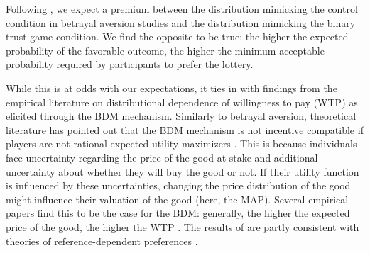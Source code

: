 Following \cite{Li2020a}, we expect a premium between the distribution mimicking the control condition in betrayal aversion studies and the distribution mimicking the binary trust game condition.
We find the opposite to be true: the higher the expected probability of the favorable outcome, the higher the minimum acceptable probability required by participants to prefer the lottery.

While this is at odds with our expectations, it ties in with findings from the empirical literature on distributional dependence of willingness to pay (WTP) as elicited through the BDM mechanism.
Similarly to betrayal aversion, theoretical literature has pointed out that the BDM mechanism is not incentive compatible if players are not rational expected utility maximizers \citep{Karni1987,Horowitz2006}.
This is because individuals face uncertainty regarding the price of the good at stake and additional uncertainty about whether they will buy the good or not.
If their utility function is influenced by these uncertainties, changing the price distribution of the good might influence their valuation of the good (here, the MAP).
Several empirical papers find this to be the case for the BDM: generally, the higher the expected price of the good, the higher the WTP \citep[for a short review of this literature, see][]{Tymula2016}.
The results of \cite{Tymula2016} are partly consistent with theories of reference-dependent preferences \citep{Koszegi2006, Koszegi2007, Wenner2015}.



